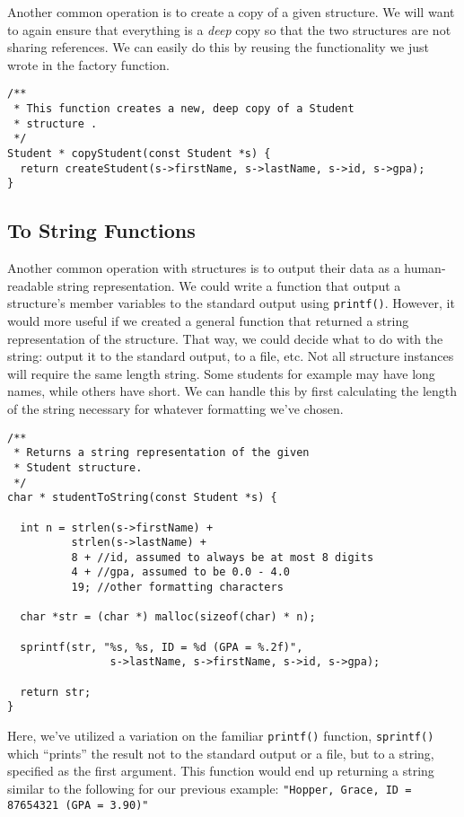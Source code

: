 Another common operation is to create a copy of a given structure.
We will want to again ensure that everything is a \emph{deep}
copy so that the two structures are not sharing references.  We
can easily do this by reusing the functionality we just wrote in
the factory function.

\begin{verbatim}
/**
 * This function creates a new, deep copy of a Student 
 * structure .
 */
Student * copyStudent(const Student *s) {
  return createStudent(s->firstName, s->lastName, s->id, s->gpa);
}
\end{verbatim}

\subsection{To String Functions}

Another common operation with structures is to output their data
as a human-readable string representation.  We could write
a function that output a structure's member variables to the standard
output using \texttt{printf()}.  However, it would more 
useful if we created a general function that returned a 
string representation of the structure.  That way, we could decide
what to do with the string: output it to the standard output,
to a file, etc.  Not all structure instances will require the same 
length string.
Some students for example may have long names, while others have
short.  We can handle this by first calculating the length of 
the string necessary for whatever formatting we've chosen.

\begin{verbatim}
/**
 * Returns a string representation of the given 
 * Student structure.
 */
char * studentToString(const Student *s) {

  int n = strlen(s->firstName) + 
          strlen(s->lastName) + 
          8 + //id, assumed to always be at most 8 digits
          4 + //gpa, assumed to be 0.0 - 4.0
          19; //other formatting characters
          
  char *str = (char *) malloc(sizeof(char) * n);

  sprintf(str, "%s, %s, ID = %d (GPA = %.2f)", 
                s->lastName, s->firstName, s->id, s->gpa);

  return str;
}
\end{verbatim}

Here, we've utilized a variation on the familiar \texttt{printf()}
function, \texttt{sprintf()} which ``prints'' the result not
to the standard output or a file, but to a string, specified as
the first argument.  This function would end up returning a string 
similar to the following for our previous example: 
\texttt{"Hopper, Grace, ID = 87654321 (GPA = 3.90)"}

